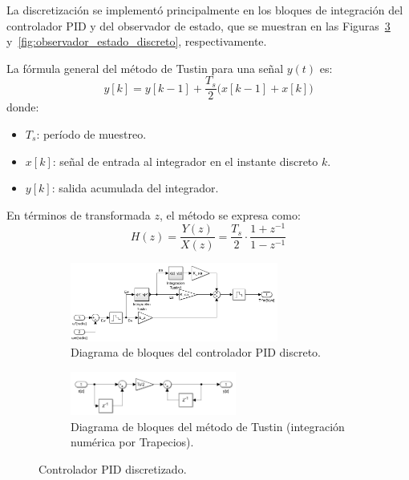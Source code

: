 \documentclass{article}
\begin{document}
La discretización se implementó principalmente en los bloques de integración del controlador PID y del observador de estado, que se muestran en las Figuras~\ref{fig:Controlador_PID_discretizado} y~\ref{fig:observador_estado_discreto}, respectivamente.

La fórmula general del método de Tustin para una señal \(y(t)\) es:
\begin{equation}
y[k] = y[k-1] + \frac{T_s}{2} \big( x[k-1] + x[k] \big)
\end{equation}
donde:
\begin{itemize}
    \item \(T_s\): período de muestreo.
    \item \(x[k]\): señal de entrada al integrador en el instante discreto \(k\).
    \item \(y[k]\): salida acumulada del integrador.
\end{itemize}

En términos de transformada \(z\), el método se expresa como:
\begin{equation}
H(z) = \frac{Y(z)}{X(z)} = \frac{T_s}{2} \cdot \frac{1+z^{-1}}{1-z^{-1}}
\end{equation}

\begin{figure}[H]
    \centering
    \begin{subfigure}[t]{\textwidth}
        \centering
        \includegraphics[width=0.75\textwidth]{Imagenes/Controlador_PID_discreto.png}
        \caption{Diagrama de bloques del controlador PID discreto.}
        \label{fig:Controlador_PID_discreto}
    \end{subfigure}
    
    \begin{subfigure}[t]{\textwidth}
        \centering
        \includegraphics[width=0.6\textwidth]{Imagenes/Integracion_Tustin.png}
        \caption{Diagrama de bloques del método de Tustin (integración numérica por Trapecios).}
        \label{fig:Integracion_Tustin}
    \end{subfigure}
    \caption{Controlador PID discretizado.}
    \label{fig:Controlador_PID_discretizado}
\end{figure}
\end{document}

